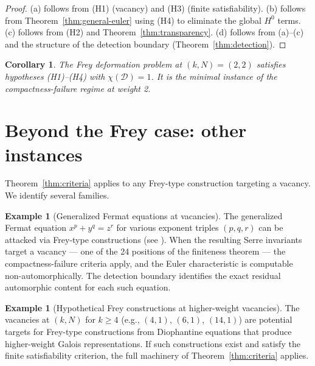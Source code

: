\documentclass[12pt]{amsart}
\newtheorem{corollary}[theorem]{Corollary}
\theoremstyle{definition}
\newtheorem{example}[theorem]{Example}
\theoremstyle{remark}
\begin{document}
\begin{proof}
(a) follows from (H1) (vacancy) and (H3) (finite satisfiability). (b) follows from Theorem~\ref{thm:general-euler} using (H4) to eliminate the global $H^0$ terms. (c) follows from (H2) and Theorem~\ref{thm:transparency}. (d) follows from (a)--(c) and the structure of the detection boundary (Theorem~\ref{thm:detection}).
\end{proof}

\begin{corollary}\label{cor:frey-instance}
The Frey deformation problem at $(k, N) = (2, 2)$ satisfies hypotheses \textup{(H1)--(H4)} with $\chi(\mathcal{D}) = 1$. It is the minimal instance of the compactness-failure regime at weight 2.
\end{corollary}

\section{Beyond the Frey case: other instances}
\label{sec:other}

Theorem~\ref{thm:criteria} applies to any Frey-type construction targeting a vacancy. We identify several families.

\begin{example}[Generalized Fermat equations at vacancies]
The generalized Fermat equation $x^p + y^q = z^r$ for various exponent triples $(p, q, r)$ can be attacked via Frey-type constructions (see \cite{Darmon, Bennett}). When the resulting Serre invariants target a vacancy --- one of the 24 positions of the finiteness theorem --- the compactness-failure criteria apply, and the Euler characteristic is computable non-automorphically. The detection boundary identifies the exact residual automorphic content for each such equation.
\end{example}

\begin{example}[Hypothetical Frey constructions at higher-weight vacancies]
The vacancies at $(k, N)$ for $k \geq 4$ (e.g., $(4, 1)$, $(6, 1)$, $(14, 1)$) are potential targets for Frey-type constructions from Diophantine equations that produce higher-weight Galois representations. If such constructions exist and satisfy the finite satisfiability criterion, the full machinery of Theorem~\ref{thm:criteria} applies.
\end{example}
\end{document}
